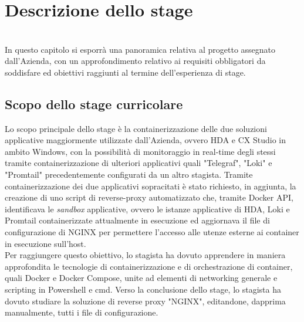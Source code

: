 
\chapter{Descrizione dello stage}
\label{cap:descrizione-stage}

\\
In questo capitolo si esporrà una panoramica relativa al progetto assegnato dall'Azienda, con un approfondimento relativo ai requisiti obbligatori da soddisfare ed obiettivi raggiunti al termine dell'esperienza di stage. 

\section{Scopo dello stage curricolare}
Lo scopo principale dello stage è la containerizzazione delle due soluzioni applicative maggiormente utilizzate dall'Azienda, ovvero \gls{HDA} e \gls{CX Studio} in ambito Windows, con la possibilità di monitoraggio in real-time degli stessi tramite containerizzazione di ulteriori applicativi quali "Telegraf", "Loki" e "Promtail" precedentemente configurati da un altro stagista.
Tramite containerizzazione dei due applicativi sopracitati è stato richiesto, in aggiunta, la creazione di uno script di reverse-proxy automatizzato che, tramite Docker API, identificava le \textit{sandbox} applicative, ovvero le istanze applicative di HDA, Loki e Promtail containerizzate attualmente in esecuzione ed aggiornava il file di configurazione di NGINX per permettere l'accesso alle utenze esterne ai container in esecuzione sull'host.\\
Per raggiungere questo obiettivo, lo stagista ha dovuto apprendere in maniera approfondita le tecnologie di containerizzazione e di orchestrazione di container, quali \gls{Docker} e \gls{Docker Compose}, unite ad elementi di networking generale e scripting in Powershell e cmd. Verso la conclusione dello stage, lo stagista ha dovuto studiare la soluzione di reverse proxy "NGINX", editandone, dapprima manualmente, tutti i file di configurazione.


